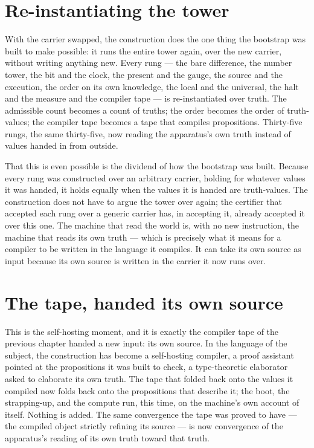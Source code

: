 \section{Re-instantiating the tower}
\label{se:re-instantiating-the-tower}

With the carrier swapped, the construction does the one thing the bootstrap was built to make possible: it
runs the entire tower again, over the new carrier, without writing anything new. Every rung --- the bare
difference, the number tower, the bit and the clock, the present and the gauge, the source and the
execution, the order on its own knowledge, the local and the universal, the halt and the measure and the
compiler tape --- is re-instantiated over truth. The admissible count becomes a count of truths; the order
becomes the order of truth-values; the compiler tape becomes a tape that compiles propositions. Thirty-five
rungs, the same thirty-five, now reading the apparatus's own truth instead of values handed in from
outside.

That this is even possible is the dividend of how the bootstrap was built. Because every rung was
constructed over an arbitrary carrier, holding for whatever values it was handed, it holds equally when the
values it is handed are truth-values. The construction does not have to argue the tower over again; the
certifier that accepted each rung over a generic carrier has, in accepting it, already accepted it over this
one. The machine that read the world is, with no new instruction, the machine that reads its own truth ---
which is precisely what it means for a compiler to be written in the language it compiles. It can take its
own source as input because its own source is written in the carrier it now runs over.

\section{The tape, handed its own source}
\label{se:tape-handed-its-own-source}

This is the self-hosting moment, and it is exactly the compiler tape of the previous chapter handed a new
input: its own source. In the language of the subject, the construction has become a self-hosting
compiler, a proof assistant pointed at the propositions it was built to check, a type-theoretic elaborator
asked to elaborate its own truth. The tape that folded back onto the values it compiled now folds back onto
the propositions that describe it; the boot, the strapping-up, and the compute run, this time, on the
machine's own account of itself. Nothing is added. The same convergence the tape was proved to have --- the
compiled object strictly refining its source --- is now convergence of the apparatus's reading of its own
truth toward that truth.

